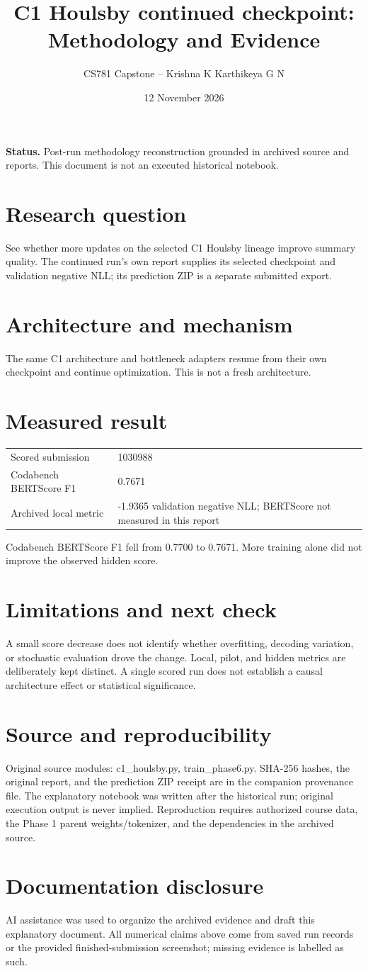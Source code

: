 \documentclass[11pt,a4paper]{article}
\title{C1 Houlsby continued checkpoint: Methodology and Evidence}
\author{CS781 Capstone -- Krishna K Karthikeya G N}
\date{12 November 2026}
\begin{document}
\maketitle
\noindent\textbf{Status.} Post-run methodology reconstruction grounded in archived source and reports. This document is not an executed historical notebook.\par
\section*{Research question}
See whether more updates on the selected C1 Houlsby lineage improve summary quality. The continued run's own report supplies its selected checkpoint and validation negative NLL; its prediction ZIP is a separate submitted export.
\section*{Architecture and mechanism}
The same C1 architecture and bottleneck adapters resume from their own checkpoint and continue optimization. This is not a fresh architecture.
\section*{Measured result}
\begin{center}\begin{tabular}{ll}Scored submission & 1030988\\
Codabench BERTScore F1 & 0.7671\\
Archived local metric & -1.9365 validation negative NLL; BERTScore not measured in this report\end{tabular}\end{center}
Codabench BERTScore F1 fell from 0.7700 to 0.7671. More training alone did not improve the observed hidden score.
\section*{Limitations and next check}
A small score decrease does not identify whether overfitting, decoding variation, or stochastic evaluation drove the change. Local, pilot, and hidden metrics are deliberately kept distinct. A single scored run does not establish a causal architecture effect or statistical significance.
\section*{Source and reproducibility}
Original source modules: c1\_houlsby.py, train\_phase6.py. SHA-256 hashes, the original report, and the prediction ZIP receipt are in the companion provenance file. The explanatory notebook was written after the historical run; original execution output is never implied. Reproduction requires authorized course data, the Phase 1 parent weights/tokenizer, and the dependencies in the archived source.
\section*{Documentation disclosure}
AI assistance was used to organize the archived evidence and draft this explanatory document. All numerical claims above come from saved run records or the provided finished-submission screenshot; missing evidence is labelled as such.
\end{document}
